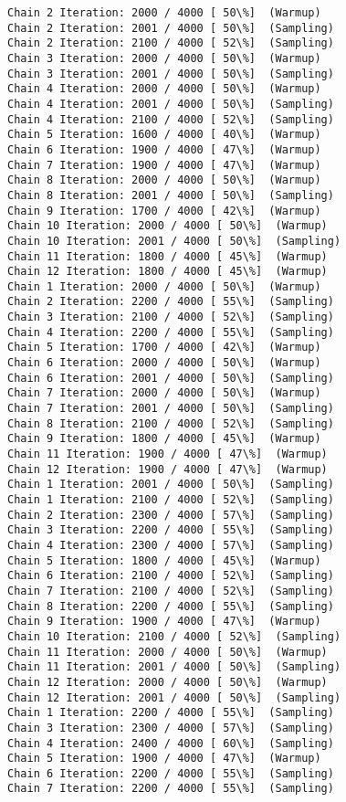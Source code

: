 \documentclass[11pt]{article}
\begin{document}
\begin{Verbatim}[commandchars=\\\{\}]
Chain 2 Iteration: 2000 / 4000 [ 50\%]  (Warmup)
Chain 2 Iteration: 2001 / 4000 [ 50\%]  (Sampling)
Chain 2 Iteration: 2100 / 4000 [ 52\%]  (Sampling)
Chain 3 Iteration: 2000 / 4000 [ 50\%]  (Warmup)
Chain 3 Iteration: 2001 / 4000 [ 50\%]  (Sampling)
Chain 4 Iteration: 2000 / 4000 [ 50\%]  (Warmup)
Chain 4 Iteration: 2001 / 4000 [ 50\%]  (Sampling)
Chain 4 Iteration: 2100 / 4000 [ 52\%]  (Sampling)
Chain 5 Iteration: 1600 / 4000 [ 40\%]  (Warmup)
Chain 6 Iteration: 1900 / 4000 [ 47\%]  (Warmup)
Chain 7 Iteration: 1900 / 4000 [ 47\%]  (Warmup)
Chain 8 Iteration: 2000 / 4000 [ 50\%]  (Warmup)
Chain 8 Iteration: 2001 / 4000 [ 50\%]  (Sampling)
Chain 9 Iteration: 1700 / 4000 [ 42\%]  (Warmup)
Chain 10 Iteration: 2000 / 4000 [ 50\%]  (Warmup)
Chain 10 Iteration: 2001 / 4000 [ 50\%]  (Sampling)
Chain 11 Iteration: 1800 / 4000 [ 45\%]  (Warmup)
Chain 12 Iteration: 1800 / 4000 [ 45\%]  (Warmup)
Chain 1 Iteration: 2000 / 4000 [ 50\%]  (Warmup)
Chain 2 Iteration: 2200 / 4000 [ 55\%]  (Sampling)
Chain 3 Iteration: 2100 / 4000 [ 52\%]  (Sampling)
Chain 4 Iteration: 2200 / 4000 [ 55\%]  (Sampling)
Chain 5 Iteration: 1700 / 4000 [ 42\%]  (Warmup)
Chain 6 Iteration: 2000 / 4000 [ 50\%]  (Warmup)
Chain 6 Iteration: 2001 / 4000 [ 50\%]  (Sampling)
Chain 7 Iteration: 2000 / 4000 [ 50\%]  (Warmup)
Chain 7 Iteration: 2001 / 4000 [ 50\%]  (Sampling)
Chain 8 Iteration: 2100 / 4000 [ 52\%]  (Sampling)
Chain 9 Iteration: 1800 / 4000 [ 45\%]  (Warmup)
Chain 11 Iteration: 1900 / 4000 [ 47\%]  (Warmup)
Chain 12 Iteration: 1900 / 4000 [ 47\%]  (Warmup)
Chain 1 Iteration: 2001 / 4000 [ 50\%]  (Sampling)
Chain 1 Iteration: 2100 / 4000 [ 52\%]  (Sampling)
Chain 2 Iteration: 2300 / 4000 [ 57\%]  (Sampling)
Chain 3 Iteration: 2200 / 4000 [ 55\%]  (Sampling)
Chain 4 Iteration: 2300 / 4000 [ 57\%]  (Sampling)
Chain 5 Iteration: 1800 / 4000 [ 45\%]  (Warmup)
Chain 6 Iteration: 2100 / 4000 [ 52\%]  (Sampling)
Chain 7 Iteration: 2100 / 4000 [ 52\%]  (Sampling)
Chain 8 Iteration: 2200 / 4000 [ 55\%]  (Sampling)
Chain 9 Iteration: 1900 / 4000 [ 47\%]  (Warmup)
Chain 10 Iteration: 2100 / 4000 [ 52\%]  (Sampling)
Chain 11 Iteration: 2000 / 4000 [ 50\%]  (Warmup)
Chain 11 Iteration: 2001 / 4000 [ 50\%]  (Sampling)
Chain 12 Iteration: 2000 / 4000 [ 50\%]  (Warmup)
Chain 12 Iteration: 2001 / 4000 [ 50\%]  (Sampling)
Chain 1 Iteration: 2200 / 4000 [ 55\%]  (Sampling)
Chain 3 Iteration: 2300 / 4000 [ 57\%]  (Sampling)
Chain 4 Iteration: 2400 / 4000 [ 60\%]  (Sampling)
Chain 5 Iteration: 1900 / 4000 [ 47\%]  (Warmup)
Chain 6 Iteration: 2200 / 4000 [ 55\%]  (Sampling)
Chain 7 Iteration: 2200 / 4000 [ 55\%]  (Sampling)

\end{Verbatim}
\end{document}
